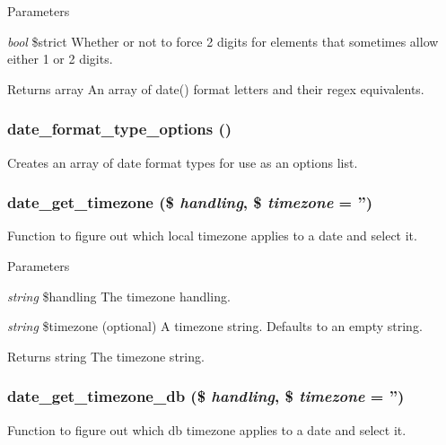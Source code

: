 \begin{DoxyParams}{Parameters}
\item[{\em bool}]\$strict Whether or not to force 2 digits for elements that sometimes allow either 1 or 2 digits.\end{DoxyParams}
\begin{DoxyReturn}{Returns}
array An array of date() format letters and their regex equivalents. 
\end{DoxyReturn}
\hypertarget{date__api_8module_ac1f737576353f61bc4b608ceb7cf76dc}{
\subsubsection[{date\_\-format\_\-type\_\-options}]{\setlength{\rightskip}{0pt plus 5cm}date\_\-format\_\-type\_\-options ()}}
\label{date__api_8module_ac1f737576353f61bc4b608ceb7cf76dc}
Creates an array of date format types for use as an options list. \hypertarget{date__api_8module_a623c76f08925c3c7699ca6d07da0d176}{
\subsubsection[{date\_\-get\_\-timezone}]{\setlength{\rightskip}{0pt plus 5cm}date\_\-get\_\-timezone (\$ {\em handling}, \/  \$ {\em timezone} = {\ttfamily ''})}}
\label{date__api_8module_a623c76f08925c3c7699ca6d07da0d176}
Function to figure out which local timezone applies to a date and select it.


\begin{DoxyParams}{Parameters}
\item[{\em string}]\$handling The timezone handling. \item[{\em string}]\$timezone (optional) A timezone string. Defaults to an empty string.\end{DoxyParams}
\begin{DoxyReturn}{Returns}
string The timezone string. 
\end{DoxyReturn}
\hypertarget{date__api_8module_ac541e9141accfab7c7ace5ea3b54b7f8}{
\subsubsection[{date\_\-get\_\-timezone\_\-db}]{\setlength{\rightskip}{0pt plus 5cm}date\_\-get\_\-timezone\_\-db (\$ {\em handling}, \/  \$ {\em timezone} = {\ttfamily ''})}}
\label{date__api_8module_ac541e9141accfab7c7ace5ea3b54b7f8}
Function to figure out which db timezone applies to a date and select it.


